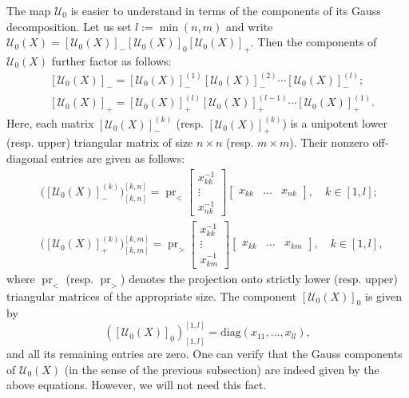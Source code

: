 \documentclass[11pt]{article}
\DeclareMathOperator{\pr}{pr}
\theoremstyle{definition}\newtheorem{definition}[theorem]{Definition}
\theoremstyle{definition}\newtheorem{remark}[theorem]{Remark}
\theoremstyle{remark}
\numberwithin{equation}{section}
\begin{document}
The map $\mathcal{U}_0$ is easier to understand in terms of the components of its Gauss decomposition. Let us set $l:=\min(n,m)$ and write $\mathcal{U}_0(X) = [\mathcal{U}_0(X)]_- [\mathcal{U}_0(X)]_0 [\mathcal{U}_0(X)]_+$. 
Then the components of $\mathcal{U}_0(X)$ further factor as follows:
\begin{align*}
    &[\mathcal{U}_0(X)]_- = [\mathcal{U}_0(X)]_-^{(1)}[\mathcal{U}_0(X)]_-^{(2)}\cdots [\mathcal{U}_0(X)]_-^{(l)};\\
    &[\mathcal{U}_0(X)]_+ = [\mathcal{U}_0(X)]_+^{(l)}[\mathcal{U}_0(X)]_+^{(l-1)}\cdots [\mathcal{U}_0(X)]_+^{(1)}.
\end{align*}
Here, each matrix $[\mathcal{U}_0(X)]_-^{(k)}$ (resp. $[\mathcal{U}_0(X)]_+^{(k)}$) is a unipotent lower (resp. upper) triangular matrix of size $n\times n$ (resp. $m \times m$). Their nonzero off-diagonal entries are given as follows: 
\begin{align*}
    &\big([\mathcal{U}_0(X)]_-^{(k)}\big)_{[k,n]}^{[k,n]} = \pr_{<} \begin{bmatrix}
        x_{kk}^{-1}\\
        \vdots \\ x_{nk}^{-1}
    \end{bmatrix} \begin{bmatrix}
        x_{kk} & \ldots& x_{nk}
    \end{bmatrix}, \quad k \in [1,l];\\
    &\big([\mathcal{U}_0(X)]_+^{(k)}\big)_{[k,m]}^{[k,m]} = \pr_{>} \begin{bmatrix}
        x_{kk}^{-1}\\
        \vdots \\ x_{km}^{-1}
    \end{bmatrix} \begin{bmatrix}
        x_{kk} & \ldots& x_{km}
    \end{bmatrix},  \quad k \in [1,l],
\end{align*}
where $\pr_{<}$ (resp. $\pr_{>}$) denotes the projection onto strictly lower (resp. upper) triangular matrices of the appropriate size. The component $[\mathcal{U}_0(X)]_0$ is given by
\begin{equation*}
    ([\mathcal{U}_0(X)]_0)_{[1,l]}^{[1,l]} = \mathrm{diag}(x_{11}, \ldots,x_{ll}),
\end{equation*}
and all its remaining entries are zero. One can verify that the Gauss components of $\mathcal{U}_0(X)$ (in the sense of the previous subsection) are indeed given by the above equations. However, we will not need this fact.
\end{document}

